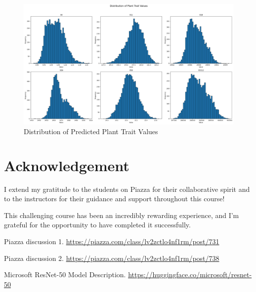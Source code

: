 \documentclass{article}
\begin{document}
\begin{figure}[h]
    \centering
    \includegraphics[width=\textwidth]{predicted_distribution.png}
    \caption{Distribution of Predicted Plant Trait Values}
    \label{fig:pred_dist}
\end{figure}

\section*{Acknowledgement}

I extend my gratitude to the students on Piazza for their collaborative spirit and to the instructors for their guidance and support throughout this course!

This challenging course has been an incredibly rewarding experience, and I'm grateful for the opportunity to have completed it successfully.

\begin{thebibliography}{9}

Piazza discussion 1.
\url{https://piazza.com/class/lv2zctlo4nf1rm/post/731}

Piazza discussion 2.
\url{https://piazza.com/class/lv2zctlo4nf1rm/post/738}

Microsoft ResNet-50 Model Description.
\url{https://huggingface.co/microsoft/resnet-50}

\end{thebibliography}
\end{document}
